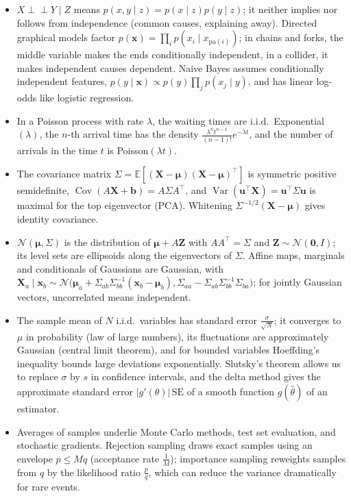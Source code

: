 \documentclass[11pt]{article}
\newcommand{\E}{\mathbb{E}}
\newcommand{\indep}{\perp\!\!\!\perp}
\DeclareMathOperator{\Var}{Var}
\DeclareMathOperator{\Cov}{Cov}
\theoremstyle{definition}
\theoremstyle{plain}
\theoremstyle{remark}
\begin{document}
\begin{itemize}[leftmargin=*]
    \item $X \indep Y \mid Z$ means $p(x, y \mid z) = p(x \mid z)p(y \mid z)$; it neither implies nor follows from independence (common causes, explaining away). Directed graphical models factor $p(\mathbf{x}) = \prod_i p(x_i \mid x_{\mathrm{pa}(i)})$; in chains and forks, the middle variable makes the ends conditionally independent, in a collider, it makes independent causes dependent. Naive Bayes assumes conditionally independent features, $p(y \mid \mathbf{x}) \propto p(y)\prod_j p(x_j \mid y)$, and has linear log-odds like logistic regression.
    \item In a Poisson process with rate $\lambda$, the waiting times are i.i.d.\ Exponential$(\lambda)$, the $n$-th arrival time has the density $\frac{\lambda^nt^{n-1}}{(n - 1)!}e^{-\lambda t}$, and the number of arrivals in the time $t$ is Poisson$(\lambda t)$.
    \item The covariance matrix $\Sigma = \E[(\mathbf{X} - \boldsymbol{\mu})(\mathbf{X} - \boldsymbol{\mu})^\top]$ is symmetric positive semidefinite, $\Cov(A\mathbf{X} + \mathbf{b}) = A\Sigma A^\top$, and $\Var(\mathbf{u}^\top\mathbf{X}) = \mathbf{u}^\top\Sigma\mathbf{u}$ is maximal for the top eigenvector (PCA). Whitening $\Sigma^{-1/2}(\mathbf{X} - \boldsymbol{\mu})$ gives identity covariance.
    \item $\mathcal{N}(\boldsymbol{\mu}, \Sigma)$ is the distribution of $\boldsymbol{\mu} + A\mathbf{Z}$ with $AA^\top = \Sigma$ and $\mathbf{Z} \sim \mathcal{N}(\mathbf{0}, I)$; its level sets are ellipsoids along the eigenvectors of $\Sigma$. Affine maps, marginals and conditionals of Gaussians are Gaussian, with $\mathbf{X}_a \mid \mathbf{x}_b \sim \mathcal{N}\big(\boldsymbol{\mu}_a + \Sigma_{ab}\Sigma_{bb}^{-1}(\mathbf{x}_b - \boldsymbol{\mu}_b), \Sigma_{aa} - \Sigma_{ab}\Sigma_{bb}^{-1}\Sigma_{ba}\big)$; for jointly Gaussian vectors, uncorrelated means independent.
    \item The sample mean of $N$ i.i.d.\ variables has standard error $\frac{\sigma}{\sqrt{N}}$; it converges to $\mu$ in probability (law of large numbers), its fluctuations are approximately Gaussian (central limit theorem), and for bounded variables Hoeffding's inequality bounds large deviations exponentially. Slutsky's theorem allows us to replace $\sigma$ by $s$ in confidence intervals, and the delta method gives the approximate standard error $|g'(\theta)|\,\mathrm{SE}$ of a smooth function $g(\hat\theta)$ of an estimator.
    \item Averages of samples underlie Monte Carlo methods, test set evaluation, and stochastic gradients. Rejection sampling draws exact samples using an envelope $p \leq Mq$ (acceptance rate $\frac{1}{M}$); importance sampling reweights samples from $q$ by the likelihood ratio $\frac{p}{q}$, which can reduce the variance dramatically for rare events.

\end{itemize}
\end{document}

